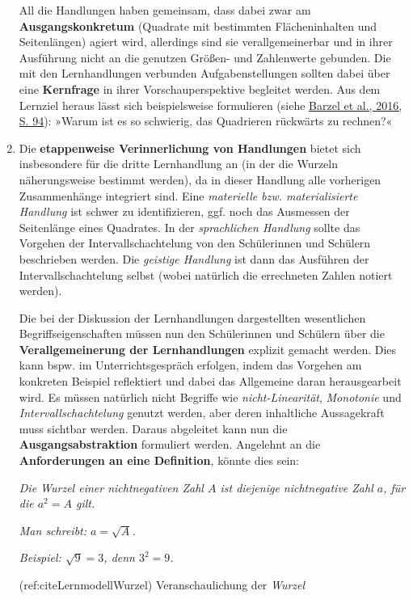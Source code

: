 \documentclass[
  ngerman,
]{scrbook}
\theoremstyle{definition}
\theoremstyle{definition}
\theoremstyle{definition}
\theoremstyle{definition}
\theoremstyle{remark}
\begin{document}
\begin{enumerate}
  All die Handlungen haben gemeinsam, dass dabei zwar am \textbf{Ausgangskonkretum} (Quadrate mit bestimmten Flächeninhalten und Seitenlängen) agiert wird, allerdings sind sie verallgemeinerbar und in ihrer Ausführung nicht an die genutzen Größen- und Zahlenwerte gebunden. Die mit den Lernhandlungen verbunden Aufgabenstellungen sollten dabei über eine \textbf{Kernfrage} in ihrer Vorschauperspektive begleitet werden. Aus dem Lernziel heraus lässt sich beispielsweise formulieren (siehe \protect\hyperlink{ref-Barzel2016}{Barzel et al., 2016, S. 94}): »Warum ist es so schwierig, das Quadrieren rückwärts zu rechnen?«
\item
  Die \textbf{etappenweise Verinnerlichung von Handlungen} bietet sich insbesondere für die dritte Lernhandlung an (in der die Wurzeln näherungsweise bestimmt werden), da in dieser Handlung alle vorherigen Zusammenhänge integriert sind. Eine \emph{materielle bzw. materialisierte Handlung} ist schwer zu identifizieren, ggf. noch das Ausmessen der Seitenlänge eines Quadrates. In der \emph{sprachlichen Handlung} sollte das Vorgehen der Intervallschachtelung von den Schülerinnen und Schülern beschrieben werden. Die \emph{geistige Handlung} ist dann das Ausführen der Intervallschachtelung selbst (wobei natürlich die errechneten Zahlen notiert werden).

  Die bei der Diskussion der Lernhandlungen dargestellten wesentlichen Begriffseigenschaften müssen nun den Schülerinnen und Schülern über die \textbf{Verallgemeinerung der Lernhandlungen} explizit gemacht werden. Dies kann bspw. im Unterrichtsgespräch erfolgen, indem das Vorgehen am konkreten Beispiel reflektiert und dabei das Allgemeine daran herausgearbeit wird. Es müssen natürlich nicht Begriffe wie \emph{nicht-Linearität}, \emph{Monotonie} und \emph{Intervallschachtelung} genutzt werden, aber deren inhaltliche Aussagekraft muss sichtbar werden. Daraus abgeleitet kann nun die \textbf{Ausgangsabstraktion} formuliert werden. Angelehnt an die \textbf{Anforderungen an eine Definition}, könnte dies sein:

  \emph{Die Wurzel einer nichtnegativen Zahl \(A\) ist diejenige nichtnegative Zahl \(a\), für die \(a^2 = A\) gilt.}

  \emph{Man schreibt: \(a = \sqrt{A}\).}

  \emph{Beispiel: \(\sqrt{9} = 3\), denn \(3^2 = 9\).}

  (ref:citeLernmodellWurzel) Veranschaulichung der \emph{Wurzel}

  \begin{figure}


\end{figure}
\end{enumerate}
\end{document}

